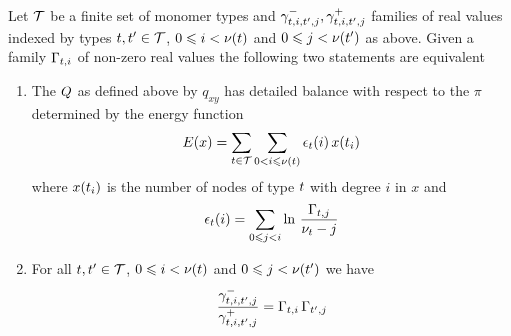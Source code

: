 \begin{proposition}
  \label{prop:cas}
  Let $\mathcal{T}$ be a finite set of monomer types
  and $\gamma^-_{t,i,t',j},\gamma^+_{t,i,t',j}$
  families of real values indexed by types $t,t' \in \mathcal{T}$,
  $0 \leqslant i < \nu(t)$ and
  $0 \leqslant j < \nu(t')$ as above.
  Given a family $\Gamma_{t,i}$ of non-zero real values
  the following two statements are equivalent
  \begin{enumerate}[label={(\roman*)}]
  \item The \qmatrix $Q$ as defined above by $q_{xy}$
    has detailed balance with respect to the \pmf $\pi$
    determined by the energy function
    \[ E(x) = \sum_{t \in \mathcal{T}} \sum_{0 < i \leqslant \nu(t)}
              \epsilon_t(i) \, x(t_i) \]
    where $x(t_i)$ is the number of nodes of type $t$
    with degree $i$ in $x$ and
    \[ \epsilon_t(i) = \sum_{0 \leqslant j < i}
       \ln\, \frac{\Gamma_{t,j}}{\nu_t - j} \]
  \item For all $t,t' \in \mathcal{T}$,
    $0 \leqslant i < \nu(t)$ and
    $0 \leqslant j < \nu(t')$ we have
    \begin{equation*}
      \frac{\gamma^-_{t,i,t',j}}{\gamma^+_{t,i,t',j}} =
      \Gamma_{t,i} \, \Gamma_{t',j}
    \end{equation*}
  \end{enumerate}
\end{proposition}
